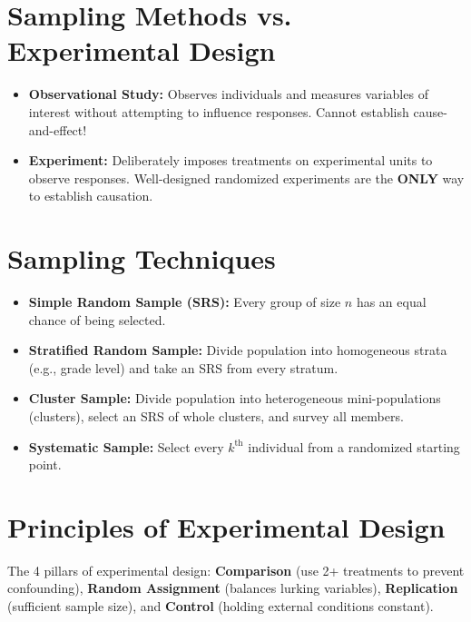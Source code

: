 \documentclass[11pt,oneside,openany]{book}
\begin{document}
\section{Sampling Methods vs. Experimental Design}
\begin{lessonbox}
\begin{itemize}[leftmargin=1.2em]
  \item \textbf{Observational Study:} Observes individuals and measures variables of interest without attempting to influence responses. Cannot establish cause-and-effect!
  \item \textbf{Experiment:} Deliberately imposes treatments on experimental units to observe responses. Well-designed randomized experiments are the \textbf{ONLY} way to establish causation.
\end{itemize}
\end{lessonbox}

\section{Sampling Techniques}
\begin{itemize}[leftmargin=1.5em]
  \item \textbf{Simple Random Sample (SRS):} Every group of size $n$ has an equal chance of being selected.
  \item \textbf{Stratified Random Sample:} Divide population into homogeneous strata (e.g., grade level) and take an SRS from every stratum.
  \item \textbf{Cluster Sample:} Divide population into heterogeneous mini-populations (clusters), select an SRS of whole clusters, and survey all members.
  \item \textbf{Systematic Sample:} Select every $k^{\text{th}}$ individual from a randomized starting point.
\end{itemize}

\section{Principles of Experimental Design}
The 4 pillars of experimental design:
\textbf{Comparison} (use 2+ treatments to prevent confounding), \textbf{Random Assignment} (balances lurking variables), \textbf{Replication} (sufficient sample size), and \textbf{Control} (holding external conditions constant).

\end{document}

